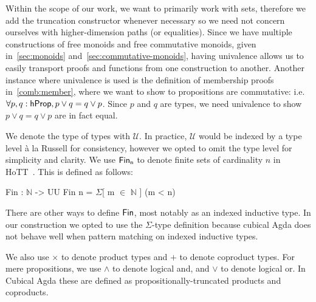 \begin{toappendix}
Within the scope of our work, we want to primarily work with
sets, therefore we add the truncation constructor whenever necessary so we need not concern ourselves
with higher-dimension paths (or equalities). Since we have multiple constructions of free monoids
and free commutative monoids, given in~\cref{sec:monoids} and~\cref{sec:commutative-monoids},
having univalence allows us to easily transport proofs and functions from one construction to another.
Another instance where univalence is used is the definition of membership proofs in~\cref{comb:member},
where we want to show to propositions are commutative: i.e. $\forall p, q: \mathsf{hProp}, p \vee q = q \vee p$.
Since $p$ and $q$ are types, we need univalence to show $p \vee q = q \vee p$ are in fact equal.
\end{toappendix}

We denote the type of types with $\mathcal{U}$. 
In practice, $\mathcal{U}$ would be indexed by a type level 
à la Russell for consistency, however we opted to omit the type level
for simplicity and clarity.
We use $\Fin[n]$ to denote finite sets of cardinality $n$ in HoTT~\cite{yorgeyCombinatorialSpeciesLabelled2014a}.
This is defined as follows:
\vspace{-1em}
\begin{code}
Fin : $\mathbb{N}$ -> UU
Fin n = $\Sigma$[ m $\in$ $\mathbb{N}$ ] (m < n)
\end{code}

There are other ways to define $\Fin$, most notably as an indexed inductive type.
In our construction we opted to use the $\Sigma$-type definition
because cubical Agda does not behave well
when pattern matching on indexed inductive types.

We also use $\times$ to denote product types and $+$ to denote coproduct types.
For mere propositions, we use $\land$ to denote logical and, and $\vee$ to denote logical or.
In Cubical Agda these are defined as propositionally-truncated products and coproducts.